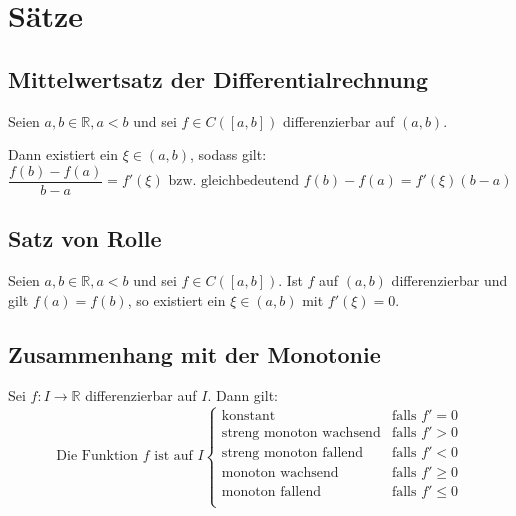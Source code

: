     \section{Sätze}
        \subsection{Mittelwertsatz der Differentialrechnung}
            Seien $ a, b \in \mathbb{R}, a < b $ und sei $ f \in C([a, b]) $ differenzierbar auf $ (a, b) $.

            Dann existiert ein $ \xi \in (a, b) $, sodass gilt:
            \begin{equation*}
                \frac{f(b) - f(a)}{b - a} = f'(\xi) \text{ bzw. gleichbedeutend } f(b) - f(a) = f'(\xi)(b - a)
            \end{equation*}

        \subsection{Satz von Rolle}
            Seien $ a, b \in \mathbb{R}, a < b $ und sei $ f \in C([a, b]) $. Ist $ f $ auf $ (a, b) $ differenzierbar und gilt $ f(a) = f(b) $, so existiert ein $ \xi \in (a, b) $ mit $ f'(\xi) = 0 $.

        \subsection{Zusammenhang mit der Monotonie}
            Sei $ f : I \rightarrow \mathbb{R} $ differenzierbar auf $ I $. Dann gilt:
            \begin{equation*}
                \text{Die Funktion } f \text{ ist auf } I
                \begin{cases}
                    \text{konstant} & \text{falls } f' = 0 \\
                    \text{streng monoton wachsend} & \text{falls } f' > 0 \\
                    \text{streng monoton fallend} & \text{falls } f' < 0 \\
                    \text{monoton wachsend} & \text{falls } f' \geq 0 \\
                    \text{monoton fallend} & \text{falls } f' \leq 0 \\
                \end{cases}
            \end{equation*}

